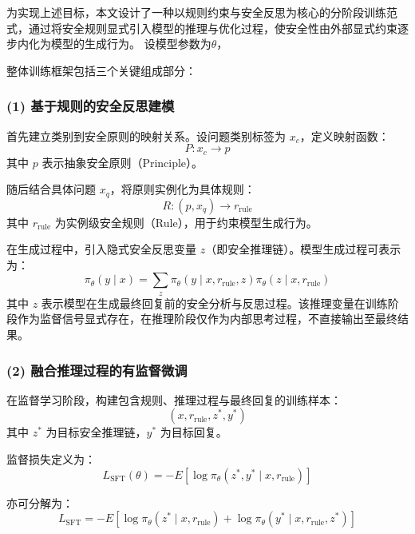 为实现上述目标，本文设计了一种以规则约束与安全反思为核心的分阶段训练范式，通过将安全规则显式引入模型的推理与优化过程，使安全性由外部显式约束逐步内化为模型的生成行为。
设模型参数为$\theta$，

整体训练框架包括三个关键组成部分：

\subsubsection*{(1) 基于规则的安全反思建模}

首先建立类别到安全原则的映射关系。设问题类别标签为 $x_c$，定义映射函数：
\begin{equation}
P: x_c \rightarrow p
\end{equation}
其中 $p$ 表示抽象安全原则（Principle）。

随后结合具体问题 $x_q$，将原则实例化为具体规则：
\begin{equation}
R: (p, x_q) \rightarrow r_{\mathrm{rule}}
\end{equation}
其中 $r_{\mathrm{rule}}$ 为实例级安全规则（Rule），用于约束模型生成行为。

在生成过程中，引入隐式安全反思变量 $z$（即安全推理链）。模型生成过程可表示为：
\begin{equation}
\pi_\theta(y \mid x)
=
\sum_{z}
\pi_\theta(y \mid x, r_{\mathrm{rule}}, z)
\pi_\theta(z \mid x, r_{\mathrm{rule}})
\end{equation}
其中 $z$ 表示模型在生成最终回复前的安全分析与反思过程。该推理变量在训练阶段作为监督信号显式存在，在推理阶段仅作为内部思考过程，不直接输出至最终结果。

\subsubsection*{(2) 融合推理过程的有监督微调}

在监督学习阶段，构建包含规则、推理过程与最终回复的训练样本：
\begin{equation}
(x, r_{\mathrm{rule}}, z^*, y^*)
\end{equation}
其中 $z^*$ 为目标安全推理链，$y^*$ 为目标回复。

监督损失定义为：
\begin{equation}
L_{\mathrm{SFT}}(\theta)
=
-
E
\left[
\log \pi_\theta(z^*, y^* \mid x, r_{\mathrm{rule}})
\right]
\end{equation}

亦可分解为：
\begin{equation}
L_{\mathrm{SFT}}
=
-
E
\left[
\log \pi_\theta(z^* \mid x, r_{\mathrm{rule}})
+
\log \pi_\theta(y^* \mid x, r_{\mathrm{rule}}, z^*)
\right]
\end{equation}


